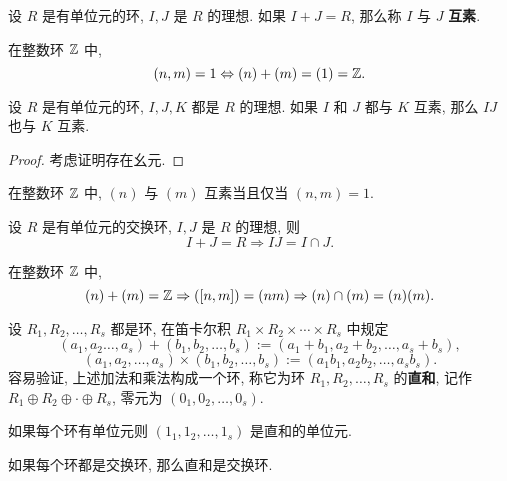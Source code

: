 \begin{definition}\label{理想的互素}
	设 $R$ 是有单位元的环, $I,J$ 是 $R$ 的理想. 如果 $I+J=R$, 那么称 $I$ 与 $J$ \textbf{互素}.
\end{definition}

\begin{example}
在整数环 $\mathbb Z$ 中, $$(n,m)=1 \Leftrightarrow (n)+(m)=(1)=\mathbb Z.$$
\end{example}

\begin{proposition}
	设 $R$ 是有单位元的环, $I,J,K$ 都是 $R$ 的理想. 如果 $I$ 和 $J$ 都与 $K$ 互素, 那么 $IJ$ 也与 $K$ 互素.
\end{proposition}

\begin{proof}
	考虑证明存在幺元.
\end{proof}

\begin{example}
在整数环 $\mathbb Z$ 中, $(n)$ 与 $(m)$ 互素当且仅当 $(n,m)=1$.
\end{example}

\begin{proposition}
	设 $R$ 是有单位元的交换环, $I,J$ 是 $R$ 的理想, 则 $$I+J=R\Rightarrow IJ=I\cap J.$$
\end{proposition}

\begin{example}
	在整数环 $\mathbb Z$ 中, $$(n)+(m)=\mathbb Z\Rightarrow ([n,m])=(nm)\Rightarrow (n)\cap (m)=(n)(m).$$
\end{example}

\begin{definition}\label{环的直和}
	设 $R_1,R_2,\ldots,R_s$ 都是环, 在笛卡尔积 $R_1\times R_2\times \cdots\times R_s$ 中规定
	\begin{equation}
		(a_1,a_2\ldots,a_s)+(b_1,b_2,\ldots,b_s):=(a_1+b_1,a_2+b_2,\ldots,a_s+b_s),
	\end{equation}
	\begin{equation}
		(a_1,a_2,\ldots,a_s)\times(b_1,b_2,\ldots,b_s):=(a_1b_1,a_2b_2,\ldots,a_sb_s).
	\end{equation}
	容易验证, 上述加法和乘法构成一个环, 称它为环 $R_1,R_2,\ldots,R_s$ 的\textbf{直和}, 记作 $R_1\oplus R_2\oplus\cdot\oplus R_s$, 零元为 $(0_1,0_2,\ldots,0_s)$.

	如果每个环有单位元则 $(1_1,1_2,\ldots,1_s)$ 是直和的单位元.

	如果每个环都是交换环, 那么直和是交换环.
\end{definition}

